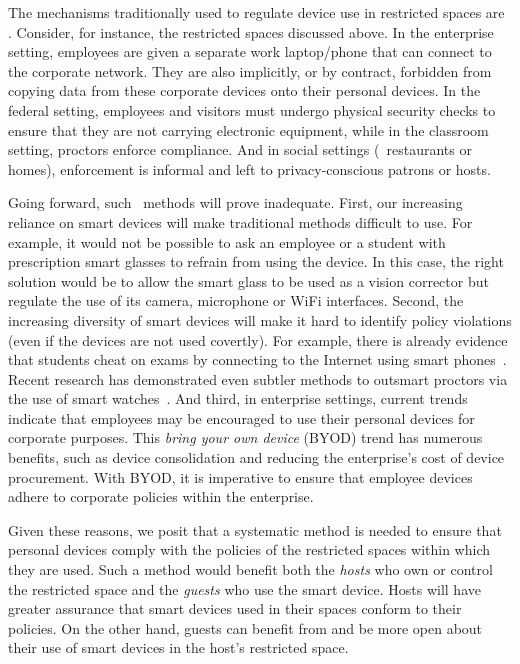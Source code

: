 The mechanisms traditionally used to regulate device use in restricted spaces
are \adhoc.  Consider, for instance, the restricted spaces discussed above. In
the enterprise setting, employees are given a separate work laptop/phone that
can connect to the corporate network. They are also implicitly, or by contract,
forbidden from copying data from these corporate devices onto their personal
devices. In the federal setting, employees and visitors must undergo physical
security checks to ensure that they are not carrying electronic equipment,
while in the classroom setting, proctors enforce compliance. And in social
settings (\eg~restaurants or homes), enforcement is informal and left to
privacy-conscious patrons or hosts.

Going forward, such \adhoc\ methods will prove inadequate. First, our
increasing reliance on smart devices will make traditional methods difficult to
use. For example, it would not be possible to ask an employee or a student with
prescription smart glasses to refrain from using the device. In this case, the
right solution would be to allow the smart glass to be used as a vision
corrector but regulate the use of its camera, microphone or WiFi interfaces.
Second, the increasing diversity of smart devices will make it hard to identify
policy violations (even if the devices are not used covertly). For example,
there is already evidence that students cheat on exams by connecting to the
Internet using smart phones~\cite{url:examcheating}. Recent research has
demonstrated even subtler methods to outsmart proctors via the use of smart
watches~\cite{smartwatch:fc14}. And third, in enterprise settings, current
trends indicate that employees may be encouraged to use their personal devices
for corporate purposes. This \textit{bring your own device} (BYOD) trend has
numerous benefits, such as device consolidation and reducing the enterprise's
cost of device procurement. With BYOD, it is imperative to ensure that employee
devices adhere to corporate policies within the enterprise.

Given these reasons, we posit that a systematic method is needed to ensure that
personal devices comply with the policies of the restricted spaces within which
they are used. Such a method would benefit both the \textit{hosts} who own or
control the restricted space and the \textit{guests} who use the smart device.
Hosts will have greater assurance that smart devices used in their spaces
conform to their policies. On the other hand, guests can benefit from and be
more open about their use of smart devices in the host's restricted space.


